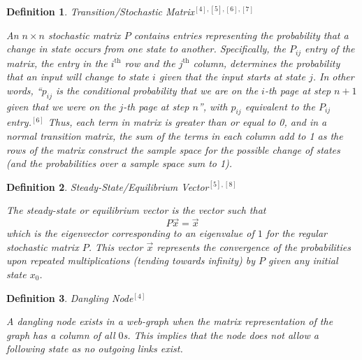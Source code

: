 \documentclass{article}
\newtheorem{definition}{Definition}
\begin{document}
    \begin{definition}{Transition/Stochastic Matrix$^{[4], [5], [6], [7]}$}
    
    \noindent
    \textup{An $n \times n$ stochastic matrix $P$ contains entries representing the probability that a change in state occurs from one state to another. Specifically, the $P_{ij}$ entry of the matrix, the entry in the $i^\text{th}$ row and the $j^\text{th}$ column, determines the probability that an input will change to state $i$ given that the input starts at state $j$. In other words, ``$p_{ij}$ is the conditional probability that we are on the $i$-th page at step $n+1$ given that we were on the $j$-th page at step $n$'', with $p_{ij}$ equivalent to the $P_{ij}$ entry.$^{[6]}$ Thus, each term in matrix is greater than or equal to 0, and in a normal transition matrix, the sum of the terms in each column add to 1 as the rows of the matrix construct the sample space for the possible change of states (and the probabilities over a sample space sum to 1).}
    
    \end{definition}
    
    \begin{definition}{Steady-State/Equilibrium Vector$^{[5], [8]}$}
    
    \noindent
    \textup{The steady-state or equilibrium vector is the vector such that $$P \Vec{x} = \Vec{x}$$ which is the eigenvector corresponding to an eigenvalue of $1$ for the regular stochastic matrix $P$. This vector $\Vec{x}$ represents the convergence of the probabilities upon repeated multiplications (tending towards infinity) by $P$ given any initial state $x_0$.}
    
    \end{definition}
    
    \begin{definition}{Dangling Node$^{[4]}$}
    
    \noindent
    \textup{A dangling node exists in a web-graph when the matrix representation of the graph has a column of all $0$s. This implies that the node does not allow a following state as no outgoing links exist.}
    
    \end{definition}
    
\end{document}
